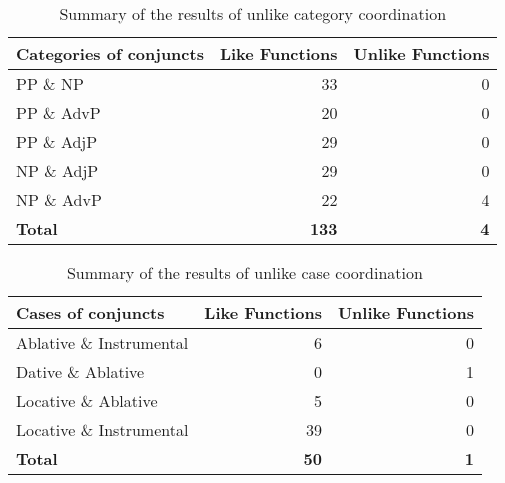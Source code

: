 \begin{table}[!h]
	\centering
	\begin{tabular}{lrr}
		\textbf{Categories of conjuncts} & \multicolumn{1}{l}{\textbf{Like Functions}} & \multicolumn{1}{l}{\textbf{Unlike Functions}} \\ \hline \hline
		PP \& NP       & 33           & 0          \\
		PP \& AdvP     & 20           & 0          \\
		PP \& AdjP     & 29           & 0          \\
		NP \& AdjP     & 29           & 0          \\
		NP \& AdvP     & 22           & 4          \\ \hline \hline
		\textbf{Total} & \textbf{133} & \textbf{4}
	\end{tabular}
	\caption{Summary of the results of unlike category coordination}
	\label{CAT-summaryresults}
\end{table}

\begin{table}[!h]
	\centering
	\begin{tabular}{lrr}
		\textbf{Cases of conjuncts} & \multicolumn{1}{l}{\textbf{Like Functions}} & \multicolumn{1}{l}{\textbf{Unlike Functions}} \\ \hline \hline
		Ablative \& Instrumental & 6           & 0          \\
		Dative \& Ablative       & 0           & 1          \\
		Locative \& Ablative     & 5           & 0          \\
		Locative \& Instrumental & 39          & 0          \\ \hline \hline
		\textbf{Total}           & \textbf{50} & \textbf{1}
	\end{tabular}
	\caption{Summary of the results of unlike case coordination}
	\label{CASE-summaryresults}
\end{table}

